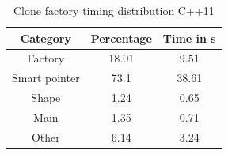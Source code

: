 {\begin{table}[h]\begin{center}
\begin{tabular}{|c|c|c|}\hline
\textbf{Category} & \textbf{Percentage} & \textbf{Time in s}\\
\hline
Factory & 18.01 & 9.51\\
\hline
Smart pointer & 73.1 & 38.61\\
\hline
Shape & 1.24 & 0.65\\
\hline
Main & 1.35 & 0.71\\
\hline
Other & 6.14 & 3.24\\
\hline
\end{tabular}
\caption{Clone factory timing distribution C++11}
\label{tab:CloneFactoryTimingDistributionCpp11}
\end{center}\end{table}



\FloatBarrier

}

